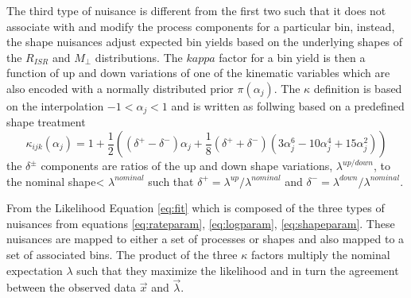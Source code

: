 The third type of nuisance is different from the first two such that it does not associate with and modify the process components for a particular bin, instead, the shape nuisances adjust expected bin yields based on the underlying shapes of the $R_{ISR}$ and $M_\perp$ distributions. The $kappa$ factor for a bin yield is then a function of up and down variations of one of the kinematic variables which are also encoded with a normally distributed prior $\pi(\alpha_j)$. The $\kappa$ definition is based on the interpolation $-1<\alpha_j<1$ and is written as follwing based on a predefined shape treatment \cite{Conway:2011in}
\begin{equation}
\label{eq:shapeparam}
\kappa_{ijk}(\alpha_j)= 1 + \frac{1}{2}((\delta^+ - \delta^-)\alpha_j + \frac{1}{8}(\delta^+ + \delta^-)(3\alpha_j^6-10\alpha_j^4+15\alpha_j^2))
\end{equation}
the $\delta^\pm$ components are ratios of the up and down shape variations, $\lambda^{up/down}$, to the nominal shape< $\lambda^{nominal}$ such that $\delta^+ = \lambda^{up}/\lambda^{nominal}$ and $\delta^- = \lambda^{down}/\lambda^{nominal}.$

From the Likelihood Equation \ref{eq:fit} which is composed of the three types of nuisances from equations \ref{eq:rateparam}, \ref{eq:logparam}, \ref{eq:shapeparam}. These nuisances are mapped to either a set of processes or shapes and also mapped to a set of associated bins. The product of the three $\kappa$ factors multiply the nominal expectation $\lambda$ such that they maximize the likelihood and in turn the agreement between the observed data $\vec{x}$ and $\vec{\lambda}$. 


